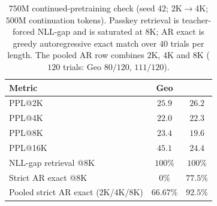 \begin{table}[ht]
\caption{$750$M continued-pretraining check (seed 42; $2$K$\rightarrow4$K;
$500$M continuation tokens). Passkey retrieval is teacher-forced NLL-gap and
is saturated at $8$K; AR exact is greedy autoregressive exact match over $40$
trials per length. The pooled AR row combines $2$K, $4$K and $8$K
($120$ trials: Geo $80/120$, \evq{} $111/120$).}
\label{tab:750m}
\centering
\small
\begin{tabular}{@{}lcc@{}}
\toprule
Metric & Geo & \evq{} \\
\midrule
PPL@2K & $25.9$ & $26.2$ \\
PPL@4K & $22.0$ & $22.3$ \\
PPL@8K & $23.4$ & $\mathbf{19.6}$ \\
PPL@16K & $45.1$ & $\mathbf{24.4}$ \\
\midrule
NLL-gap retrieval @8K & $100\%$ & $100\%$ \\
Strict AR exact @8K & $0\%$ & $\mathbf{77.5\%}$ \\
Pooled strict AR exact (2K/4K/8K) & $66.67\%$ & $\mathbf{92.5\%}$ \\
\bottomrule
\end{tabular}
\end{table}
